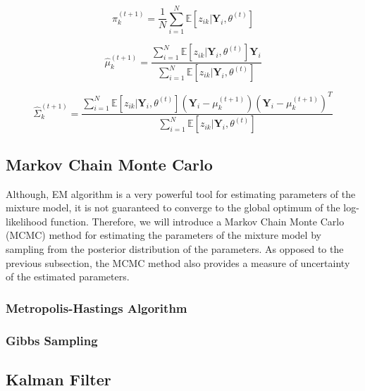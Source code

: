 \begin{equation}
    \hat{\pi}_k^{(t+1)} = \frac{1}{N} \sum_{i=1}^{N} \mathbb{E}[z_{ik}|\textbf{Y}_i,\theta^{(t)}]
\end{equation}

\begin{equation}
    \hat{\mu}_k^{(t+1)} = \frac{\sum_{i=1}^{N} \mathbb{E}[z_{ik}|\textbf{Y}_i,\theta^{(t)}] \textbf{Y}_i}{\sum_{i=1}^{N} \mathbb{E}[z_{ik}|\textbf{Y}_i,\theta^{(t)}]}
\end{equation}

\begin{equation}
    \hat{\Sigma}_k^{(t+1)} = \frac{\sum_{i=1}^{N} \mathbb{E}[z_{ik}|\textbf{Y}_i,\theta^{(t)}](\textbf{Y}_i - \mu_k^{(t+1)}){(\textbf{Y}_i - \mu_k^{(t+1)})}^T}{\sum_{i=1}^{N} \mathbb{E}[z_{ik}|\textbf{Y}_i,\theta^{(t)}]}
\end{equation}

\subsection{Markov Chain Monte Carlo}

Although, EM algorithm is a very powerful tool for estimating parameters of the mixture model,
it is not guaranteed to converge to the global optimum of the log-likelihood function. Therefore, 
we will introduce a Markov Chain Monte Carlo (MCMC) method for estimating the parameters of the mixture model by 
sampling from the posterior distribution of the parameters. As opposed to the previous subsection, the MCMC method 
also provides a measure of uncertainty of the estimated parameters.     

\subsubsection{Metropolis-Hastings Algorithm}

\subsubsection{Gibbs Sampling}

\subsection{Kalman Filter}

